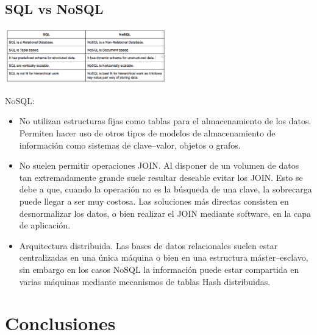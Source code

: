 \documentclass[%
 reprint,
 amsmath,amssymb,
 aps,
]{revtex4-1}
\begin{document}
\subsection{SQL vs NoSQL}

	\begin{center}
	\includegraphics[width=7cm]{./Imagenes/tablasqlno}
	\end{center}
	\par NoSQL: 
	\begin{itemize}
	\item No utilizan estructuras fijas como tablas para el almacenamiento de los datos. Permiten hacer uso de otros tipos de modelos de almacenamiento de información como sistemas de clave–valor, objetos o grafos.
	\item No suelen permitir operaciones JOIN. Al disponer de un volumen de datos tan extremadamente grande suele resultar deseable evitar los JOIN. Esto se debe a que, cuando la operación no es la búsqueda de una clave, la sobrecarga puede llegar a ser muy costosa. Las soluciones más directas consisten en desnormalizar los datos, o bien realizar el JOIN mediante software, en la capa de aplicación.
	\item Arquitectura distribuida. Las bases de datos relacionales suelen estar centralizadas en una única máquina o bien en una estructura máster–esclavo, sin embargo en los casos NoSQL la información puede estar compartida en varias máquinas mediante mecanismos de tablas Hash distribuidas.
	\end{itemize}
	\cite{comparison}
	

\section{Conclusiones}\label{sec:6}
\end{document}
